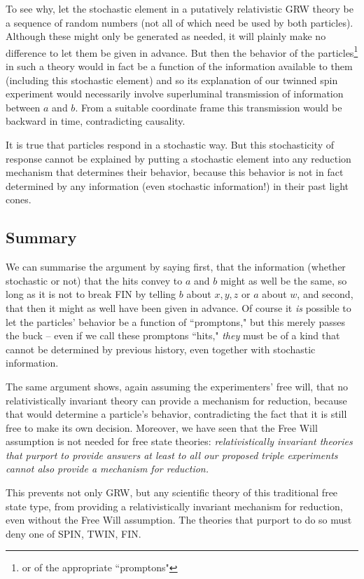 \documentclass[12pt]{amsart}
\begin{document}
To see why, let the stochastic element in a putatively relativistic GRW theory be a sequence of random numbers (not all of which need be used by both particles).  Although these might only be generated as needed, it will plainly make no difference to let them be given in advance.  But then the behavior of the particles\footnote{or of the appropriate ``promptons"} in such a theory would in fact be a function of the information available to them (including this stochastic element) and so its explanation of our twinned spin experiment would necessarily involve superluminal transmission of information between $a$ and $b$.  From a suitable coordinate frame this transmission would be backward in time, contradicting causality.

It is true that particles respond in a stochastic way. 
But this stochasticity of response cannot be explained by putting a stochastic 
element into any reduction mechanism that determines their behavior, 
because this behavior is not in fact determined by any information 
(even stochastic information!) in their past light cones.

\subsection {Summary}

We can summarise the argument by saying first, that the information (whether stochastic or not) that the hits convey to $a$ and $b$ might as well be the same, so long as it is not to break FIN by telling $b$ about $x,y,z$ or $a$ about $w$, and second, that then it might as well have been given in advance. Of course it {\em is} possible to let the particles' behavior be a function of ``promptons," but this merely passes the buck -- even if we call these promptons ``hits," {\em they} must be of a kind that cannot be determined by
previous history, even together with stochastic information.

The same argument shows, again assuming the experimenters' free will, 
that no relativistically invariant theory can provide a mechanism 
for reduction, because that would determine a particle's
behavior, contradicting the fact that it is still free to make its own decision.  Moreover, we have seen that the Free Will assumption is not needed for free state theories:
{\it relativistically invariant theories that purport to provide 
answers at least to all our proposed triple experiments cannot 
also provide a mechanism for reduction.}  

This prevents not only GRW, but any scientific theory of this traditional 
free state type, from providing a relativistically invariant mechanism 
for reduction, even without the Free Will assumption.  The theories that 
purport to do so must deny one of SPIN, TWIN, FIN.
   
\end{document}
